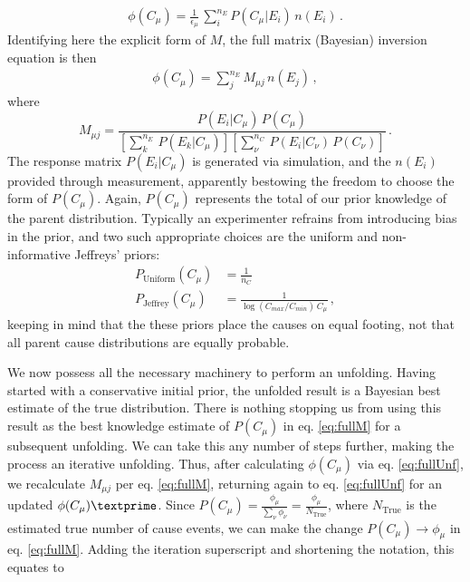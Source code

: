\begin{equation}
 \begin{split}
  \phi(C_{\mu}) = \frac{1}{\epsilon_{\mu}} \, \sum_{i}^{n_{E}} P(C_{\mu}|E_{i}) \, n(E_{i}) \, .
 \end{split}
\end{equation}
Identifying here the explicit form of $M$, the full matrix (Bayesian) inversion equation is then 
\begin{equation} \label{eq:fullUnf}
 \begin{split}
  \phi(C_{\mu}) = \sum_{j}^{n_E}M_{\mu j} \, n(E_{j}) \, ,
 \end{split}
\end{equation}
where 
\begin{equation} \label{eq:fullM}
	M_{\mu j}= \frac{P(E_{i}|C_{\mu}) \, P(C_{\mu})}{[\sum_{k}^{n_{E}} \, P(E_{k}|C_{\mu})][\sum_{\nu}^{n_{C}} \, P(E_{i}|C_{\nu}) \, P(C_{\nu})]} \, .
\end{equation}
The response matrix $P(E_{i}|C_{\mu})$ is generated via simulation, and the $n(E_{i})$ provided through measurement, 
apparently bestowing the freedom to choose the form of $P(C_{\mu})$. 
Again, $P(C_{\mu})$ represents the total of our prior knowledge of the parent distribution. 
Typically an experimenter refrains from introducing bias in the prior, and two such
appropriate choices are the uniform and non-informative Jeffreys' \cite{jeffreys} priors:
\begin{equation*} \label{eq:Priors}
 \begin{aligned}
  P_{\mathrm{Uniform}}(C_{\mu}) &= \frac{1}{n_C}\\ 
  P_{\mathrm{Jeffrey}}(C_{\mu}) &= \frac{1}{\log(C_{max}/C_{min}) \, C_{\mu}} \, ,
 \end{aligned}
\end{equation*}
keeping in mind that the these priors place the causes on equal footing,
not that all parent cause distributions are equally probable.

We now possess all the necessary machinery to perform an unfolding.
Having started with a conservative initial prior, the unfolded result is a Bayesian best estimate 
of the true distribution. 
There is nothing stopping us from using this result as the best knowledge estimate of $P(C_{\mu})$ 
in eq. \ref{eq:fullM} for a subsequent unfolding.
We can take this any number of steps further, making the process an iterative unfolding. 
Thus, after calculating $\phi(C_{\mu})$ via eq. \ref{eq:fullUnf}, 
we recalculate $M_{\mu j}$ per eq. \ref{eq:fullM}, returning again to eq. \ref{eq:fullUnf} 
for an updated $\phi(C_{\mu})\textprime$.
Since $P(C_{\mu}) = \frac{\phi_{\mu}}{\sum_{\nu}{\phi_{\nu}}} = \frac{\phi_{\mu}}{N_{\mathrm{True}}}$, 
where $N_{\mathrm{True}}$ is the estimated true number of 
cause events, we can make the change $P(C_{\mu}) \rightarrow \phi_{\mu}$ in eq. \ref{eq:fullM}. 
Adding the iteration superscript and shortening the notation, this equates to

